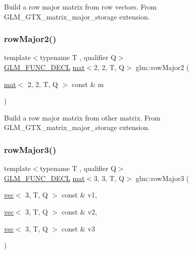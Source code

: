 Build a row major matrix from row vectors. From G\+L\+M\+\_\+\+G\+T\+X\+\_\+matrix\+\_\+major\+\_\+storage extension. \mbox{\label{group__gtx__matrix__major__storage_gaf66c75ed69ca9e87462550708c2c6726}} 
\subsubsection{\texorpdfstring{row\+Major2()}{rowMajor2()}\hspace{0.1cm}{\footnotesize\ttfamily [2/2]}}
{\footnotesize\ttfamily template$<$typename T , qualifier Q$>$ \\
\mbox{\hyperlink{setup_8hpp_ab2d052de21a70539923e9bcbf6e83a51}{G\+L\+M\+\_\+\+F\+U\+N\+C\+\_\+\+D\+E\+CL}} \mbox{\hyperlink{structglm_1_1mat}{mat}}$<$2, 2, T, Q$>$ glm\+::row\+Major2 (\begin{DoxyParamCaption}\item[{\mbox{\hyperlink{structglm_1_1mat}{mat}}$<$ 2, 2, T, Q $>$ const \&}]{m }\end{DoxyParamCaption})}

Build a row major matrix from other matrix. From G\+L\+M\+\_\+\+G\+T\+X\+\_\+matrix\+\_\+major\+\_\+storage extension. \mbox{\label{group__gtx__matrix__major__storage_ga2ae46497493339f745754e40f438442e}} 
\subsubsection{\texorpdfstring{row\+Major3()}{rowMajor3()}\hspace{0.1cm}{\footnotesize\ttfamily [1/2]}}
{\footnotesize\ttfamily template$<$typename T , qualifier Q$>$ \\
\mbox{\hyperlink{setup_8hpp_ab2d052de21a70539923e9bcbf6e83a51}{G\+L\+M\+\_\+\+F\+U\+N\+C\+\_\+\+D\+E\+CL}} \mbox{\hyperlink{structglm_1_1mat}{mat}}$<$3, 3, T, Q$>$ glm\+::row\+Major3 (\begin{DoxyParamCaption}\item[{\mbox{\hyperlink{structglm_1_1vec}{vec}}$<$ 3, T, Q $>$ const \&}]{v1,  }\item[{\mbox{\hyperlink{structglm_1_1vec}{vec}}$<$ 3, T, Q $>$ const \&}]{v2,  }\item[{\mbox{\hyperlink{structglm_1_1vec}{vec}}$<$ 3, T, Q $>$ const \&}]{v3 }\end{DoxyParamCaption})}

